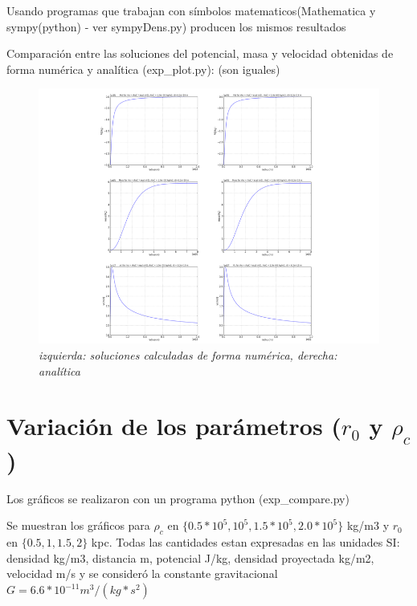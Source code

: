\documentclass[12pt]{book}
\begin{document}
\begin{description}
\item Usando programas que trabajan con símbolos matematicos(Mathematica y sympy(python) -  ver sympyDens.py) producen los mismos resultados 
\item Comparación entre las soluciones del potencial, masa y velocidad obtenidas de forma numérica y analítica (exp\_plot.py):
(son iguales)

\begin{figure}[!ht]
 \centering
 \includegraphics[scale=0.7]{allNumAn.png}
 \caption{\emph{izquierda: soluciones calculadas de forma numérica, derecha: analítica}}
\end{figure}

\end{description}

\clearpage

\section*{Variación de los parámetros ($r_0$ y $\rho_c$)}

\begin{description}
\item Los gráficos se realizaron con un programa python (exp\_compare.py) 
\item Se muestran los gráficos  para $\rho_c$ en $ \{0.5 * 10^5, 10^5, 1.5 * 10^5, 2.0 * 10^5 \}  $ kg/m3 y $r_0$ en $\{0.5 , 1, 1.5  ,2 \} $ kpc. 
Todas las cantidades estan expresadas en las unidades SI: densidad kg/m3, distancia m, potencial J/kg, densidad proyectada kg/m2, velocidad m/s y se consideró la constante gravitacional $G = 6.6 * 10^{-11} m^3/(kg * s^2)$

\end{description}
\end{document}
